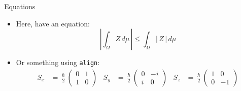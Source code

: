 \documentclass[aspectratio=169]{beamer}    %
\begin{document}
	\begin{frame}{Equations}
		\begin{itemize}
			\item Here, have an equation:
			\[
			\left|\int_{\Omega} Z\, d\mu\,\right| 
			\leq \int_{\Omega} |\,Z\,|\, d\mu
			\]
			\item Or something using \texttt{align}:
			\begin{align*}
				S_x &= \frac{\hslash}{2} \begin{pmatrix}
					0 & 1 \\ 1 & 0 \end{pmatrix} &
				S_y &= \frac{\hslash}{2} \begin{pmatrix}
					0 & -i \\ i & 0 \end{pmatrix} &
				S_z &= \frac{\hslash}{2} \begin{pmatrix}
					1 & 0 \\ 0 & -1 \end{pmatrix}
			\end{align*}
		\end{itemize}
	\end{frame}
	
\end{document}
